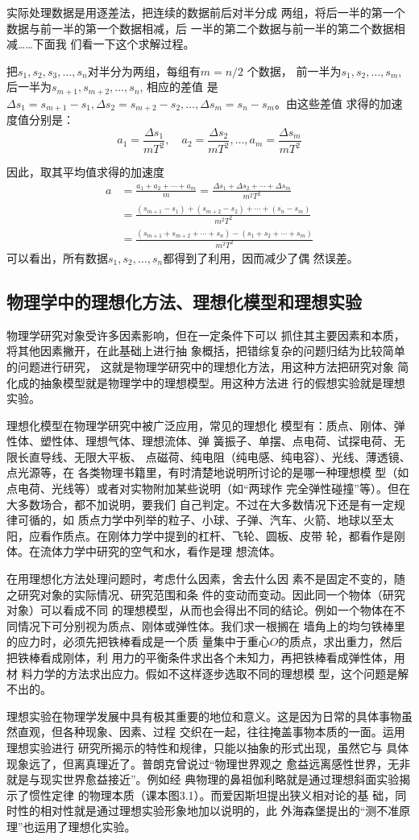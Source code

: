 实际处理数据是用逐差法，把连续的数据前后对半分成
两组，将后一半的第一个数据与前一半的第一个数据相减，后
一半的第二个数据与前一半的第二个数据相减……下面我
们看一下这个求解过程。

把$s_1,s_2,s_3,\ldots,s_n$对半分为两组，每组有$m=n/2$
个数据，
前一半为$s_1,s_2,\ldots,s_m$, 后一半为$s_{m+1},s_{m+2},\ldots,s_n$, 相应的差值
是$\Delta s_1=s_{m+1}-s_1,\Delta s_2=s_{m+2}-s_2,\ldots, \Delta s_m=s_{n}-s_m$。由这些差值
求得的加速度值分别是：
\[a_1=\frac{\Delta s_1}{mT^2},\quad a_2=\frac{\Delta s_2}{mT^2},\ldots, a_m=\frac{\Delta s_m}{mT^2} \]

因此，取其平均值求得的加速度
\[\begin{split}
   a&=\frac{a_1+a_2+\cdots+a_m}{m}=\frac{\Delta s_1+\Delta s_2+\cdots+\Delta s_m}{m^2T^2}\\
   &=\frac{(s_{m+1}-s_1)+(s_{m+2}-s_2)+\cdots+(s_{n}-s_m)}{m^2T^2}\\
   &=\frac{(s_{m+1}+s_{m+2}+\cdots+s_n)-(s_1+s_2+\cdots+s_m)}{m^2T^2} 
\end{split}\]
可以看出，所有数据$s_1,s_2,\ldots,s_n$都得到了利用，因而减少了偶
然误差。

\subsection{物理学中的理想化方法、理想化模型和理想实验}

物理学研究对象受许多因素影响，但在一定条件下可以
抓住其主要因素和本质，将其他因素撇开，在此基础上进行抽
象概括，把错综复杂的问题归结为比较简单的问题进行研究，
这就是物理学研究中的理想化方法，用这种方法把研究对象
简化成的抽象模型就是物理学中的理想模型。用这种方法进
行的假想实验就是理想实验。

理想化模型在物理学研究中被广泛应用，常见的理想化
模型有：质点、刚体、弹性体、塑性体、理想气体、理想流体、弹
簧振子、单摆、点电荷、试探电荷、无限长直导线、无限大平板、
点磁荷、纯电阻（纯电感、纯电容）、光线、薄透镜、点光源等，在
各类物理书籍里，有时清楚地说明所讨论的是哪一种理想模
型（如点电荷、光线等）或者对实物附加某些说明（如“两球作
完全弹性碰撞”等）。但在大多数场合，都不加说明，要我们
自己判定。不过在大多数情况下还是有一定规律可循的，如
质点力学中列举的粒子、小球、子弹、汽车、火箭、地球以至太
阳，应看作质点。在刚体力学中提到的杠杆、飞轮、圆板、皮带
轮，都看作是刚体。在流体力学中研究的空气和水，看作是理
想流体。

在用理想化方法处理问题时，考虑什么因素，舍去什么因
素不是固定不变的，随之研究对象的实际情况、研究范围和条
件的变动而变动。因此同一个物体（研究对象）可以看成不同
的理想模型，从而也会得出不同的结论。例如一个物体在不
同情况下可分别视为质点、刚体或弹性体。我们求一根搁在
墙角上的均匀铁棒里的应力时，必须先把铁棒看成是一个质
量集中于重心$O$的质点，求出重力，然后把铁棒看成刚体，利
用力的平衡条件求出各个未知力，再把铁棒看成弹性体，用材
料力学的方法求出应力。假如不这样逐步选取不同的理想模
型，这个问题是解不出的。

理想实验在物理学发展中具有极其重要的地位和意义。这是因为日常的具体事物虽然直观，但各种现象、因素、过程
交织在一起，往往掩盖事物本质的一面。运用理想实验进行
研究所揭示的特性和规律，只能以抽象的形式出现，虽然它与
具体现象远了，但离真理近了。普朗克曾说过“物理世界观之
愈益远离感性世界，无非就是与现实世界愈益接近”。例如经
典物理的鼻祖伽利略就是通过理想斜面实验揭示了惯性定律
的物理本质（课本图3.1）。而爱因斯坦提出狭义相对论的基
础，同时性的相对性就是通过理想实验形象地加以说明的，此
外海森堡提出的“测不准原理”也运用了理想化实验。





